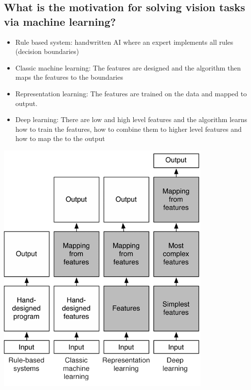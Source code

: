 \subsection{What is the motivation for solving vision tasks via machine learning?}
\begin{minipage}{0.6\textwidth}
\begin{itemize}
\item Rule based system: handwritten AI where an expert implements all rules (decision boundaries)
\item Classic machine learning: The features are designed and the algorithm then maps the features to the boundaries
\item Representation learning: The features are trained on the data and mapped to output.
\item Deep learning: There are low and high level features and the algorithm learns how to train the features, how to combine them to higher level features and how to map the to the output
\end{itemize}
\end{minipage}
\begin{minipage}{0.4\textwidth}\hspace{0.25cm}\includegraphics[width=\textwidth]{./img/motivation.png}
\end{minipage}

